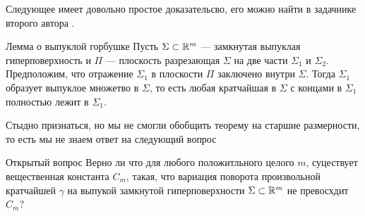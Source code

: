 \documentclass[a4paper,10pt]{article}
\begin{document}
Следующее имеет довольно простое доказательсво, 
его можно найти в задачнике второго автора \cite{petrunin-orthodox}.

\begin{thm}{Лемма о выпуклой горбушке}
Пусть $\Sigma\subset\mathbb{R}^m$ --- замкнутая выпуклая гиперповерхность и
$\Pi$ --- плоскость разрезающая $\Sigma$ на две части $\Sigma_1$ и $\Sigma_2$.
Предположим, что отражение $\Sigma_1$ в плоскости $\Pi$ заключено внутри  $\Sigma$.
Тогда $\Sigma_1$ образует выпуклое множетво в $\Sigma$,
то есть любая кратчайшая в $\Sigma$ с концами в $\Sigma_1$ полностью лежит в $\Sigma_1$.
\end{thm}

Стыдно признаться, но мы не смогли обобщить теорему на старшие размерности,
то есть мы не знаем ответ на следующий вопрос

\begin{thm}{Открытый вопрос}
Верно ли что для любого положитльного целого $m$,
суцествует вещественная константа $C_m$,
такая, что вариация поворота произвольной кратчайшей $\gamma$ на выпукой замкнутой гиперповерхности $\Sigma\subset\mathbb{R}^m$ не превосхдит $C_m$?
\end{thm}







\end{document}
